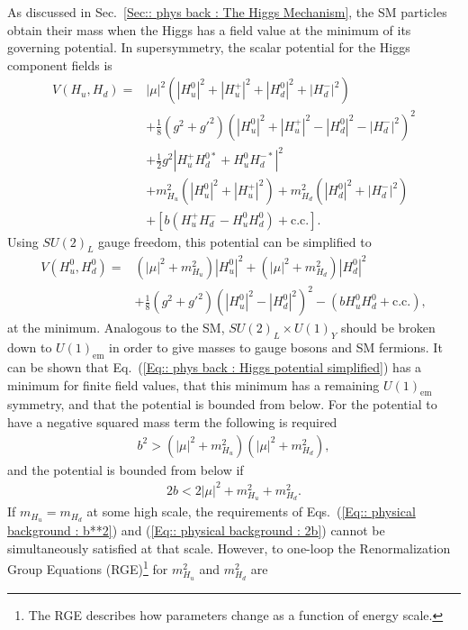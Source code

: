 \documentclass[twoside,english]{uiofysmaster}
\begin{document}
{As discussed in Sec.~\ref{Sec:: phys back : The Higgs Mechanism}, the SM particles obtain their mass when the Higgs has a field value at the minimum of its governing potential. In supersymmetry, the scalar potential for the Higgs component fields is
\begin{align}
V(H_u, H_d) =& |\mu|^2 (|H_u^0|^2 + |H_u^+|^2 + |H_d^0|^2 + |H_d^-|^2) \nonumber \\
&+ \frac{1}{8} (g^2+{g'}^2)(|H_u^0|^2 + |H_u^+|^2 - |H_d^0|^2 - |H_d^-|^2)^2 \nonumber \\
&+ \frac{1}{2} g^2 |H_u^+H_d^{0*} + H_u^0H_d^{-*}|^2 \nonumber \\
&+ m_{H_u}^2 (|H_u^0|^2 + |H_u^+|^2) + m_{H_d}^2 (|H_d^0|^2 + |H_d^-|^2) \nonumber \\
&+ [b (H_u^+H_d^- - H_u^0 H_d^0) + \text{c.c.}].
\end{align}
Using $SU(2)_L$ gauge freedom, this potential can be simplified to 
\begin{align}\label{Eq:: phys back : Higgs potential simplified}
V(H_u^0, H_d^0) =& (|\mu|^2 + m_{H_u}^2) |H_u^0|^2 + (|\mu|^2 + m_{H_d}^2)|H_d^0|^2 \nonumber \\
&+ \frac{1}{8}(g^2 + {g'}^2)(|H_u^0|^2 - |H_d^0|^2)^2 - (bH_u^0 H_d^0 + \text{c.c.}),
\end{align}
at the minimum. Analogous to the SM, $SU(2)_L \times U(1)_Y$ should be broken down to $U(1)_{\mathrm{em}}$ in order to give masses to gauge bosons and SM fermions. It can be shown that Eq.~(\ref{Eq:: phys back : Higgs potential simplified}) has a minimum for finite field values, that this minimum has a remaining $U(1)_{\mathrm{em}}$ symmetry, and that the potential is bounded from below. For the potential to have a negative squared mass term the following is required
\begin{align}\label{Eq:: physical background : b**2}
b^2 > (|\mu|^2 + m_{H_u}^2)(|\mu|^2 + m_{H_d}^2),
\end{align}
and the potential is bounded from below if
\begin{align}\label{Eq:: physical background : 2b}
2b < 2 |\mu|^2 + m_{H_u}^2 + m^2_{H_d}.
\end{align}
If $m_{H_u} = m_{H_d}$ at some high scale,  the requirements of Eqs.~(\ref{Eq:: physical background : b**2}) and (\ref{Eq:: physical background : 2b}) cannot be simultaneously satisfied at that scale. However, to one-loop the Renormalization Group Equations (RGE)\footnote{The RGE describes how parameters change as a function of energy scale.}  for $m_{H_u}^2$ and $m_{H_d}^2$ are 
}
\end{document}
